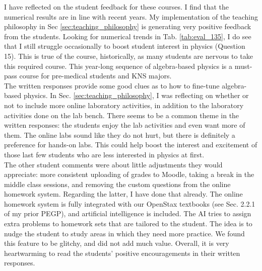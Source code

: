 \documentclass[../../main.tex]{subfiles}
\begin{document}
I have reflected on the student feedback for these courses.  I find that the numerical results are in line with recent years.  My implementation of the teaching philosophy in Sec \ref{sec:teaching_philosophy} is generating very positive feedback from the students.  Looking for numerical trends in Tab. \ref{tab:eval_135}, I do see that I still struggle occasionally to boost student interest in physics (Question 15).  This is true of the course, historically, as many students are nervous to take this required course.  This year-long sequence of algebra-based physics is a must-pass course for pre-medical students and KNS majors.
\\
\vspace{0.15cm}
The written responses provide some good clues as to how to fine-tune algebra-based physics.  In Sec. \ref{sec:teaching_philosophy}, I was reflecting on whether or not to include more online laboratory activities, in addition to the laboratory activities done on the lab bench.  There seems to be a common theme in the written responses: the students enjoy the lab activities and even want more of them.  The online labs sound like they do not hurt, but there is definitely a preference for hands-on labs.  This could help boost the interest and excitement of those last few students who are less interested in physics at first.
\\
\vspace{0.15cm}
The other student comments were about little adjustments they would appreciate: more consistent uploading of grades to Moodle, taking a break in the middle class sessions, and removing the custom questions from the online homework system.  Regarding the latter, I have done that already.  The online homework system is fully integrated with our OpenStax textbooks (see Sec. 2.2.1 of my prior PEGP), and artificial intelligence is included.  The AI tries to assign extra problems to homework sets that are tailored to the student.  The idea is to nudge the student to study areas in which they need more practice.  We found this feature to be glitchy, and did not add much value.  Overall, it is very heartwarming to read the students' positive encouragements in their written responses.
\end{document}
